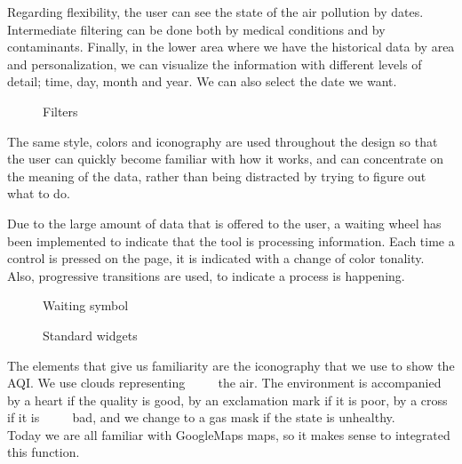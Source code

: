 Regarding flexibility, the user can see the state of the air pollution by dates. Intermediate filtering can be done both by medical conditions and by contaminants. Finally, in the lower area where we have
the historical data by area and personalization, we can visualize the information with different levels of detail; time, day, month and year. We can also
select the date we want.

\begin{figure}[ht]
    \centering
    \hfill
    \vfill
  
  \caption{Filters}
    \end{figure}
    The same style, colors and iconography are used throughout the design so that the user can quickly become familiar with how it works, and can
    concentrate on the meaning of the data, rather than being distracted by trying to figure out what to do.
    
    Due to the large amount of data that is offered to the user, a waiting wheel has been implemented to indicate
    that the tool is processing information. Each time a control is pressed on the page, it is indicated with a change
    of color tonality. Also, progressive transitions are used, to indicate a process is happening.
    
    \begin{figure}[ht]
        \centering
    
        \caption{Waiting symbol}
    \end{figure}
    
    \begin{figure}[ht]
        \centering
        \hfill
        \vfill
         \hfill
      
      \caption{Standard widgets}
        \end{figure}

        The elements that give us familiarity are the iconography that we use to show the AQI. We use clouds representing
             the air. The environment is accompanied by a heart if the quality is good, by an exclamation mark if it is poor, by a cross if it is
             bad, and we change to a gas mask if the state is unhealthy.
            
             Today we are all familiar with GoogleMaps maps, so it makes sense to integrated this function.      





